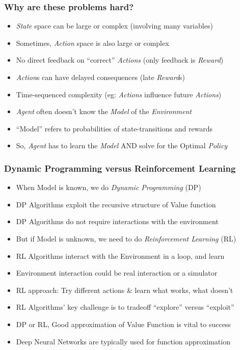 \documentclass[handout]{beamer}
\begin{document}
\begin{frame}
\frametitle{Why are these problems hard?}
\pause
\begin{itemize}[<+->]
\item {\em State} space can be large or complex (involving many variables)
\item Sometimes, {\em Action} space is also large or complex
\item No direct feedback on ``correct'' {\em Actions} (only feedback is {\em Reward})
\item {\em Action}s can have delayed consequences (late {\em Reward}s)
\item Time-sequenced complexity (eg: {\em Actions} influence future {\em Actions})
\item {\em Agent} often doesn't know the {\em Model} of the {\em Environment}
\item ``Model'' refers to probabilities of state-transitions and rewards
\item So, {\em Agent} has to learn the {\em Model} AND solve for the Optimal {\em Policy}
\end{itemize}
\end{frame}

\begin{frame}
\frametitle{Dynamic Programming versus Reinforcement Learning}
\pause
\begin{itemize}[<+->]
\item When Model is known, we do {\em Dynamic Programming} (DP)
\item DP Algorithms exploit the recursive structure of Value function
\item DP Algorithms do not require interactions with the environment
\item But if Model is unknown, we need to do {\em Reinforcement Learning} (RL)
\item RL Algorithms interact with the Environment in a loop, and learn
\item Environment interaction could be real interaction or a simulator
\item RL approach: Try different actions \& learn what works, what doesn't
\item RL Algorithms' key challenge is to tradeoff ``explore'' versus ``exploit''
\item DP or RL, Good approximation of Value Function is vital to success
\item Deep Neural Networks are typically used for function approximation
\end{itemize}
\end{frame}
\end{document}
